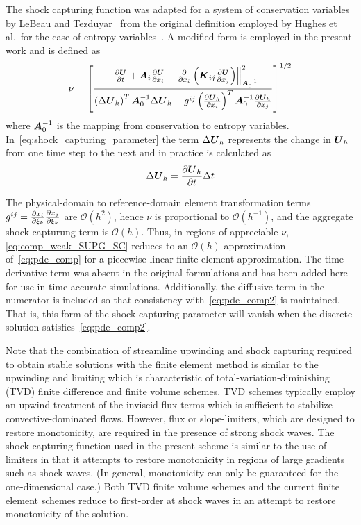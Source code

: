 The shock capturing function was adapted for a system of conservation variables by LeBeau and Tezduyar~\cite{skaliabadi_dissertation,aliabadi_tezduyar_IJNMF_1995,gjlebeau_thesis} from the original definition employed by Hughes et al.\ for the case of entropy variables~\cite{shakib_hughes_ns,hughes_shock_capturing}. A modified form is employed in the present work and is defined as
\begin{equation}
  \label{eq:shock_capturing_parameter}
  \nu = \left[\frac{\left\|{\frac{\partial{{\boldsymbol{U}}}}{\partial{t}}} + {\boldsymbol{A}}_i{\frac{\partial{{\boldsymbol{U}}}}{\partial{x_i}}}
        - {\frac{\partial{}}{\partial{x_i}}} \left( {\boldsymbol{K}}_{ij} {\frac{\partial{{\boldsymbol{U}}}}{\partial{x_j}}} \right)\right\|^2_{{\boldsymbol{A}}_0^{-1}}}
    { \left(\Delta{\boldsymbol{U}}_h\right)^T{\boldsymbol{A}}_0^{-1}\Delta{\boldsymbol{U}}_h + g^{ij} \left({\frac{\partial{{\boldsymbol{U}}_h}}{\partial{x_i}}}\right)^T{\boldsymbol{A}}_0^{-1}{\frac{\partial{{\boldsymbol{U}}_h}}{\partial{x_j}}}}\right]^{1/2}
\end{equation}
where ${\boldsymbol{A}}_0^{-1}$ is the mapping from conservation to entropy variables.  In~\eqref{eq:shock_capturing_parameter} the term $\Delta{\boldsymbol{U}}_h$ represents the change in ${\boldsymbol{U}}_h$ from one time step to the next and in practice is calculated as
\begin{equation}
  \Delta{\boldsymbol{U}}_h = {\frac{\partial{{\boldsymbol{U}}_h}}{\partial{t}}} \Delta t
\end{equation}

The physical-domain to reference-domain element transformation terms $g^{ij}= {\frac{\partial{x_i}}{\partial{\xi_k}}}{\frac{\partial{x_j}}{\partial{\xi_k}}}$ are $\mathcal{O}(h^2)$, hence $\nu$ is proportional to $\mathcal{O}(h^{-1})$, and the aggregate shock capturung term is $\mathcal{O}(h)$.  Thus, in regions of appreciable $\nu$, \eqref{eq:comp_weak_SUPG_SC} reduces to an $\mathcal{O}(h)$ approximation of~\eqref{eq:pde_comp} for a piecewise linear finite element approximation. The time derivative term was absent in the original formulations and has been added here for use in time-accurate simulations.  Additionally, the diffusive term in the numerator is included so that consistency with~\eqref{eq:pde_comp2} is maintained.  That is, this form of the shock capturing parameter will vanish when the discrete solution satisfies~\eqref{eq:pde_comp2}.

Note that the combination of streamline upwinding and shock capturing required to obtain stable solutions with the finite element method is similar to the upwinding and limiting which is characteristic of total-variation-diminishing (TVD) finite difference and finite volume schemes.  TVD schemes typically employ an upwind treatment of the inviscid flux terms which is sufficient to stabilize convective-dominated flows.  However, flux or slope-limiters, which are designed to restore monotonicity, are required in the presence of strong shock waves. The shock capturing function used in the present scheme is similar to the use of limiters in that it attempts to restore monotonicity in regions of large gradients such as shock waves. (In general, monotonicity can only be guaranteed for the one-dimensional case.) Both TVD finite volume schemes and the current finite element schemes reduce to first-order at shock waves in an attempt to restore monotonicity of the solution.


